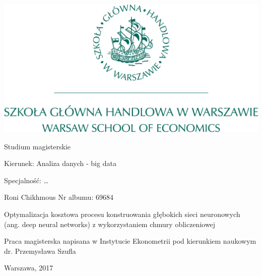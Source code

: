 \documentclass[12pt,a4paper,twoside]{article}
\begin{document}
\begin{center}

  \includegraphics[scale=0.3]{../obrazy/sgh_full.png}

  \vspace{1cm}
  Studium magisterskie

\end{center}

\vspace{1cm}

\noindent Kierunek: Analiza danych - big data

\noindent Specjalność: \dots

\vspace{1cm}

{
\leftskip=10cm\noindent
Roni Chikhmous\newline
Nr albumu: 69684

}

\vspace{2cm}

\begin{center}
  \LARGE
  Optymalizacja kosztowa procesu konstruowania głębokich sieci neuronowych (ang. deep neural networks) z wykorzystaniem chmury obliczeniowej
\end{center}

\vspace{1cm}

{
\leftskip=10cm\noindent
Praca magisterska napisana\newline
w Instytucie Ekonometrii\newline
pod kierunkiem naukowym\newline
dr. Przemysława Szufla

}

\vfill

\begin{center}
Warszawa, 2017
\end{center}
\thispagestyle{empty}
\end{document}
